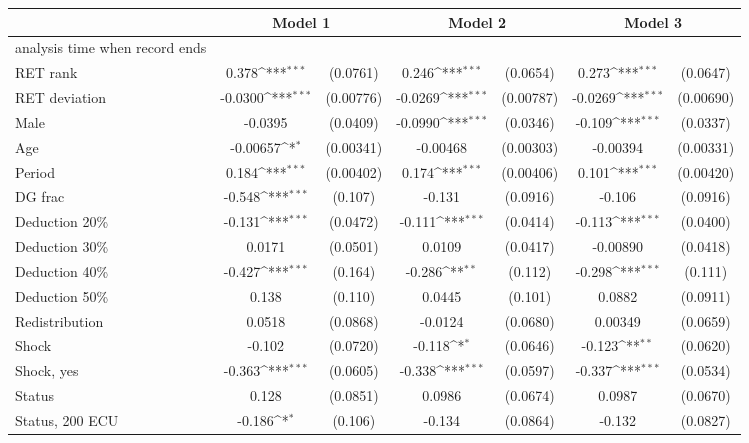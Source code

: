 {
\def\sym#1{\ifmmode^{#1}\else\(^{#1}\)\fi}
\begin{tabular}{l*{3}{cc}}
\hline\hline
                &\multicolumn{2}{c}{Model 1} &\multicolumn{2}{c}{Model 2} &\multicolumn{2}{c}{Model 3} \\
\hline
analysis time when record ends&                  &         &                  &         &                  &         \\
RET rank        &    0.378\sym{***}& (0.0761)&    0.246\sym{***}& (0.0654)&    0.273\sym{***}& (0.0647)\\
RET deviation   &  -0.0300\sym{***}&(0.00776)&  -0.0269\sym{***}&(0.00787)&  -0.0269\sym{***}&(0.00690)\\
Male            &  -0.0395         & (0.0409)&  -0.0990\sym{***}& (0.0346)&   -0.109\sym{***}& (0.0337)\\
Age             & -0.00657\sym{*}  &(0.00341)& -0.00468         &(0.00303)& -0.00394         &(0.00331)\\
Period          &    0.184\sym{***}&(0.00402)&    0.174\sym{***}&(0.00406)&    0.101\sym{***}&(0.00420)\\
DG frac         &   -0.548\sym{***}&  (0.107)&   -0.131         & (0.0916)&   -0.106         & (0.0916)\\
Deduction 20\%  &   -0.131\sym{***}& (0.0472)&   -0.111\sym{***}& (0.0414)&   -0.113\sym{***}& (0.0400)\\
Deduction 30\%  &   0.0171         & (0.0501)&   0.0109         & (0.0417)& -0.00890         & (0.0418)\\
Deduction 40\%  &   -0.427\sym{***}&  (0.164)&   -0.286\sym{**} &  (0.112)&   -0.298\sym{***}&  (0.111)\\
Deduction 50\%  &    0.138         &  (0.110)&   0.0445         &  (0.101)&   0.0882         & (0.0911)\\
Redistribution  &   0.0518         & (0.0868)&  -0.0124         & (0.0680)&  0.00349         & (0.0659)\\
Shock           &   -0.102         & (0.0720)&   -0.118\sym{*}  & (0.0646)&   -0.123\sym{**} & (0.0620)\\
Shock, yes      &   -0.363\sym{***}& (0.0605)&   -0.338\sym{***}& (0.0597)&   -0.337\sym{***}& (0.0534)\\
Status          &    0.128         & (0.0851)&   0.0986         & (0.0674)&   0.0987         & (0.0670)\\
Status, 200 ECU &   -0.186\sym{*}  &  (0.106)&   -0.134         & (0.0864)&   -0.132         & (0.0827)\\

\end{tabular}}
